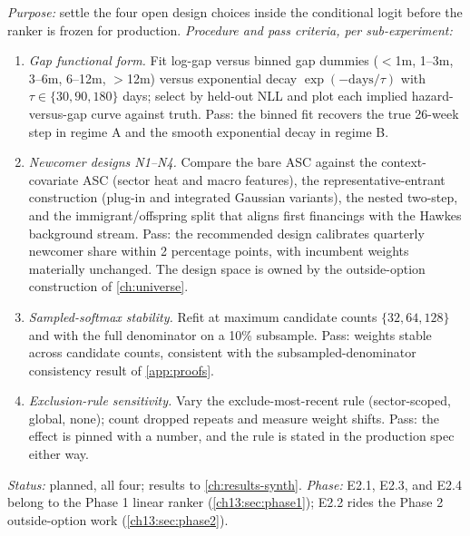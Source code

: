 \begin{protocol}
\label{chcp:prot:e2}
\emph{Purpose:} settle the four open design choices inside the conditional logit before the ranker is frozen
for production. \emph{Procedure and pass criteria, per sub-experiment:}
\begin{enumerate}[label=E2.\arabic*,leftmargin=3.2em]
\item \emph{Gap functional form.} Fit log-gap versus binned gap dummies ($<$1m, 1--3m, 3--6m, 6--12m, $>$12m)
versus exponential decay $\exp(-\text{days}/\tau)$ with $\tau \in \{30, 90, 180\}$ days; select by held-out
NLL and plot each implied hazard-versus-gap curve against truth. Pass: the binned fit recovers the true
26-week step in regime A and the smooth exponential decay in regime B.
\item \emph{Newcomer designs N1--N4.} Compare the bare ASC against the context-covariate ASC (sector heat and
macro features), the representative-entrant construction (plug-in and integrated Gaussian variants), the
nested two-step, and the immigrant/offspring split that aligns first financings with the Hawkes background
stream. Pass: the recommended design calibrates quarterly newcomer share within 2 percentage points, with
incumbent weights materially unchanged. The design space is owned by the outside-option construction of
\cref{ch:universe}.
\item \emph{Sampled-softmax stability.} Refit at maximum candidate counts $\{32, 64, 128\}$ and with the full
denominator on a 10\% subsample. Pass: weights stable across candidate counts, consistent with the
subsampled-denominator consistency result of \cref{app:proofs}.
\item \emph{Exclusion-rule sensitivity.} Vary the exclude-most-recent rule (sector-scoped, global, none);
count dropped repeats and measure weight shifts. Pass: the effect is pinned with a number, and the rule is
stated in the production spec either way.
\end{enumerate}
\emph{Status:} planned, all four; results to \cref{ch:results-synth}. \emph{Phase:} E2.1, E2.3, and E2.4
belong to the Phase 1 linear ranker (\cref{ch13:sec:phase1}); E2.2 rides the Phase 2 outside-option work
(\cref{ch13:sec:phase2}).
\end{protocol}

